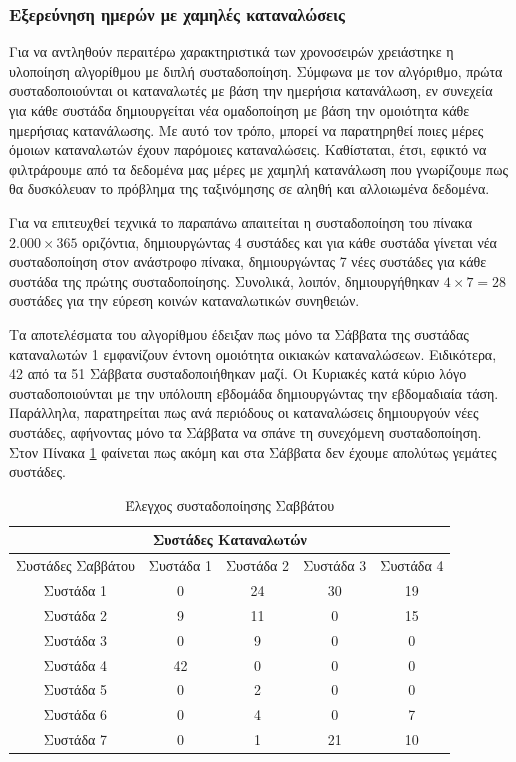 \subsubsection{Εξερεύνηση ημερών με χαμηλές καταναλώσεις}
Για να αντληθούν περαιτέρω χαρακτηριστικά των χρονοσειρών χρειάστηκε η υλοποίηση αλγορίθμου με διπλή συσταδοποίηση. Σύμφωνα με τον αλγόριθμο, πρώτα συσταδοποιούνται οι καταναλωτές με βάση την ημερήσια κατανάλωση, εν συνεχεία για κάθε συστάδα δημιουργείται νέα ομαδοποίηση με βάση την ομοιότητα κάθε ημερήσιας κατανάλωσης. Με αυτό τον τρόπο, μπορεί να παρατηρηθεί ποιες μέρες όμοιων καταναλωτών έχουν παρόμοιες καταναλώσεις. Καθίσταται, έτσι, εφικτό να φιλτράρουμε από τα δεδομένα μας μέρες με χαμηλή κατανάλωση που γνωρίζουμε πως θα δυσκόλευαν το πρόβλημα της ταξινόμησης σε αληθή και αλλοιωμένα δεδομένα.\par
Για να επιτευχθεί τεχνικά το παραπάνω απαιτείται η συσταδοποίηση του πίνακα $2.000 \times 365$ οριζόντια, δημιουργώντας 4 συστάδες και για κάθε συστάδα γίνεται νέα συσταδοποίηση στον ανάστροφο πίνακα, δημιουργώντας 7 νέες συστάδες για κάθε συστάδα της πρώτης συσταδοποίησης. Συνολικά, λοιπόν, δημιουργήθηκαν $4 \times 7 = 28$ συστάδες για την εύρεση κοινών καταναλωτικών συνηθειών.\par
Τα αποτελέσματα του αλγορίθμου έδειξαν πως μόνο τα Σάββατα της συστάδας καταναλωτών 1 εμφανίζουν έντονη ομοιότητα οικιακών καταναλώσεων. Ειδικότερα, 42 από τα 51 Σάββατα συσταδοποιήθηκαν μαζί. Οι Κυριακές κατά κύριο λόγο συσταδοποιούνται με την υπόλοιπη εβδομάδα δημιουργώντας την εβδομαδιαία τάση. Παράλληλα, παρατηρείται πως ανά περιόδους οι καταναλώσεις δημιουργούν νέες συστάδες, αφήνοντας μόνο τα Σάββατα να σπάνε τη συνεχόμενη συσταδοποίηση. Στον Πίνακα \ref{tab:double clustering} φαίνεται πως ακόμη και στα Σάββατα δεν έχουμε απολύτως γεμάτες συστάδες.

\begin{table}[ht!]
\centering
\begin{tabular}{ |c||c|c|c|c|  }
 \hline
 \multicolumn{5}{|c|}{Συστάδες Καταναλωτών} \\
 \hline
 Συστάδες Σαββάτου  & Συστάδα 1& Συστάδα 2 &Συστάδα 3 &Συστάδα 4\\
 \hline
 Συστάδα 1 & 0  & 24 & 30 & 19\\
 Συστάδα 2 & 9  & 11 & 0  & 15\\
 Συστάδα 3 & 0  & 9  & 0  & 0\\
 Συστάδα 4 & 42 & 0  & 0  & 0\\
 Συστάδα 5 & 0  & 2  & 0  & 0\\
 Συστάδα 6 & 0  & 4  & 0  & 7\\
 Συστάδα 7 & 0  & 1  & 21 & 10\\
 \hline
\end{tabular}
\caption{Έλεγχος συσταδοποίησης Σαββάτου}
\label{tab:double clustering}
\end{table}


